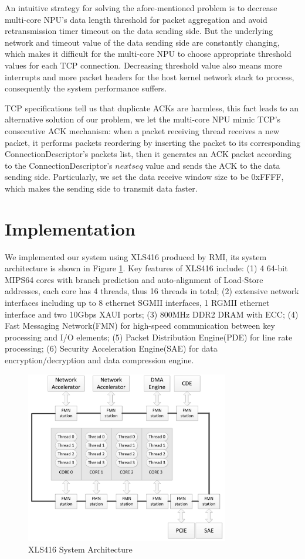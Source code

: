 \documentclass[conference]{IEEEtran}
\begin{document}
 An intuitive strategy for solving the afore-mentioned problem is to decrease multi-core NPU's data length threshold for packet aggregation and avoid retransmission timer timeout on the data sending side. But the underlying network and timeout value of the data sending side are constantly changing, which makes it difficult for the multi-core NPU to choose appropriate threshold values for each TCP connection. Decreasing threshold value also means more interrupts and more packet headers for the host kernel network stack to process, consequently the system performance suffers.

 TCP specifications tell us that duplicate ACKs are harmless, this fact leads to an alternative solution of our problem, we let the multi-core NPU mimic TCP's consecutive ACK mechanism: when a packet receiving thread receives a new packet, it performs packets reordering by inserting the packet to its corresponding ConnectionDescriptor's packets list, then it generates an ACK packet according to the ConnectionDescriptor's $nextseq$ value and sends the ACK to the data sending side. Particularly, we set the data receive window size to be 0xFFFF, which makes the sending side to transmit data faster.
\section{Implementation}
We implemented our system using XLS416 produced by RMI, its system architecture is shown in Figure \ref{xls416}. Key features of XLS416 include: (1) 4 64-bit MIPS64 cores with branch prediction and auto-alignment of Load-Store addresses, each core has 4 threads, thus 16 threads in total; (2) extensive network interfaces including up to 8 ethernet SGMII interfaces, 1 RGMII ethernet interface and two 10Gbps XAUI ports; (3) 800MHz DDR2 DRAM with ECC; (4) Fast Messaging Network(FMN) for high-speed communication between key processing and I/O elements; (5) Packet Distribution Engine(PDE) for line rate processing; (6) Security Acceleration Engine(SAE) for data encryption/decryption and data compression engine.
\begin{figure}[!t]
\centering
\includegraphics[width=3.5in]{xls416}
\caption{XLS416 System Architecture}
\label{xls416}
\end{figure}
\end{document}
